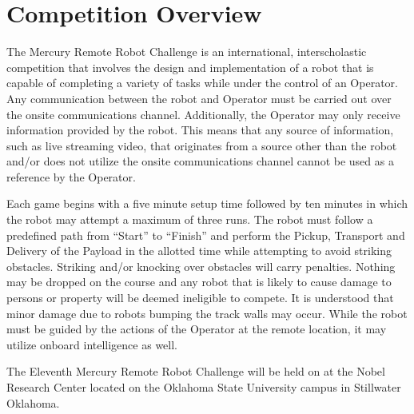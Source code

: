 \section{Competition Overview}
The Mercury Remote Robot Challenge is an international, interscholastic competition that involves the design and implementation of a robot that is capable of completing a variety of tasks while under the control of an Operator. Any communication between the robot and Operator must be carried out over the onsite communications channel. Additionally, the Operator may only receive information provided by the robot. This means that any source of information, such as live streaming video, that originates from a source other than the robot and/or does not utilize the onsite communications channel cannot be used as a reference by the Operator.

Each game begins with a five minute setup time followed by ten minutes in which the robot may attempt a maximum of three runs. The robot must follow a predefined path from “Start” to “Finish” and perform the Pickup, Transport and Delivery of the Payload in the allotted time while attempting to avoid striking obstacles. Striking and/or knocking over obstacles will carry penalties. Nothing may be dropped on the course and any robot that is likely to cause damage to persons or property will be deemed ineligible to compete. It is understood that minor damage due to robots bumping the track walls may occur. While the robot must be guided by the actions of the Operator at the remote location, it may utilize onboard intelligence as well.

The Eleventh Mercury Remote Robot Challenge will be held on \textbf{\competition} at the Nobel Research Center located on the Oklahoma State University campus in Stillwater Oklahoma.